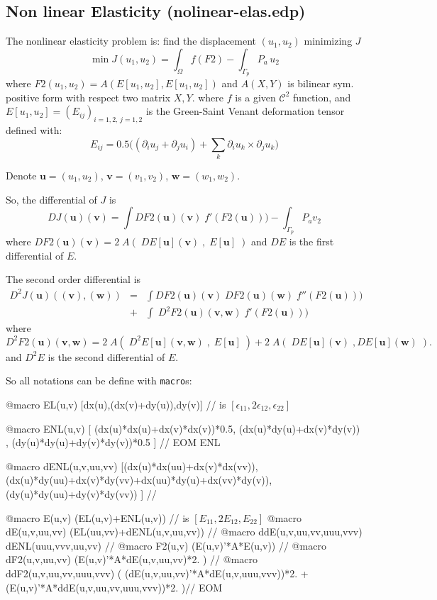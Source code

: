 \documentclass[a4paper,twoside,12pt]{book}
\def\p{\partial}
\begin{document}
\textBlack\subsection{Non linear Elasticity (nolinear-elas.edp)}
\textBlack
The nonlinear elasticity  problem is: find  the displacement $(u_{1},u_{2})$  minimizing  $J$
$$ \min J(u_{1},u_{2}) = \int_{\Omega} f(F2) -  \int_{\Gamma_{p}} P_{a} \,  u_{2} $$
where  $F2(u_{1},u_{2}) =  A(E[u_{1},u_{2}],E[u_{1},u_{2}])$ and $A(X,Y)$ is bilinear sym. positive form with respect two matrix $X,Y$.
where $f$ is a given $\mathcal{C}^2$  function, and $E[u_{1},u_{2}] = (E_{ij})_{i=1,2,\,j=1,2}$ is the Green-Saint Venant deformation tensor defined  with:
$$  E_{ij} = 0.5 \big( ( \p_i u_j + \p_j u_i ) + \sum_k \p_i u_k {\times} \p_j u_k \big) $$

Denote $\mathbf{u}=(u_{1},u_{2})$, $\mathbf{v}=(v_{1},v_{2})$, $\mathbf{w}=(w_{1},w_{2})$.

So, the differential of $J$ is
  $$ DJ(\bm{u})(\bm{v}) =  \int  DF2(\bm{u})(\bm{v}) \;f'(F2(\bm{u}))) -  \int_{\Gamma_{p}} P_{a}  v_{2}  $$
  where  $ DF2(\bm{u})(\bm{v}) = 2 \; A(\;DE[\mathbf{u}](\mathbf{v})\;,\;E[\mathbf{u}]\;) $ and  $DE$ is the first  differential of $E$.


The second order differential is
 {\begin{eqnarray*}
 D^2 J(\mathbf{u})((\mathbf{v}),(\mathbf{w}))  &=& \displaystyle\int  DF2(\bm{u})(\bm{v}) \; DF2(\bm{u})(\bm{w}) \; f''(F2(\mathbf{u}))) \\
 & +&  \displaystyle\int \; D^2F2(\bm{u})(\bm{v},\bm{w}) \; f'(F2(\mathbf{u})))
\end{eqnarray*}}
 where
  $$
  D^2F2(\bm{u})(\bm{v},\bm{w}) = 2 \; A(\;D^2E[\mathbf{u}](\bm{v},\bm{w})\;,\;E[\bm{u}]\;) + 2 \; A(\;DE[\bm{u}](\bm{v})\;,DE[\bm{u}](\bm{w})\;) .$$
 and $D^{2}E$ is the  second differential of $E$.
 \medskip

So all notations  can be define with \texttt{macro}s:

\bFF
@macro EL(u,v) [dx(u),(dx(v)+dy(u)),dy(v)] // is $[\epsilon_{11},2\epsilon_{12},\epsilon_{22}]$

@macro ENL(u,v) [
(dx(u)*dx(u)+dx(v)*dx(v))*0.5,
(dx(u)*dy(u)+dx(v)*dy(v))    ,
(dy(u)*dy(u)+dy(v)*dy(v))*0.5 ] // EOM ENL

@macro dENL(u,v,uu,vv) [(dx(u)*dx(uu)+dx(v)*dx(vv)),
 (dx(u)*dy(uu)+dx(v)*dy(vv)+dx(uu)*dy(u)+dx(vv)*dy(v)),
 (dy(u)*dy(uu)+dy(v)*dy(vv)) ] //


@macro E(u,v) (EL(u,v)+ENL(u,v)) // is $[E_{11},2E_{12},E_{22}]$
@macro dE(u,v,uu,vv) (EL(uu,vv)+dENL(u,v,uu,vv)) //
@macro ddE(u,v,uu,vv,uuu,vvv) dENL(uuu,vvv,uu,vv) //
@macro F2(u,v) (E(u,v)'*A*E(u,v)) //
@macro dF2(u,v,uu,vv)  (E(u,v)'*A*dE(u,v,uu,vv)*2. ) //
@macro ddF2(u,v,uu,vv,uuu,vvv) (
            (dE(u,v,uu,vv)'*A*dE(u,v,uuu,vvv))*2.
          + (E(u,v)'*A*ddE(u,v,uu,vv,uuu,vvv))*2.  )// EOM
\eFF
\end{document}
